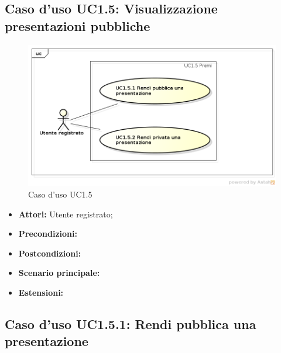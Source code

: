 \subsection{Caso d'uso UC1.5: Visualizzazione presentazioni pubbliche}

\begin{figure}[h]
	\begin{center}
	\includegraphics[scale=0.4]{diagram/UC1-5.png}
	\caption{Caso d'uso UC1.5}
	\end{center}
\end{figure}

\begin{itemize}
	\item \textbf{Attori:} Utente registrato; 
	\item \textbf{Precondizioni:}
	\item \textbf{Postcondizioni:}
	\item \textbf{Scenario principale:}
	\item \textbf{Estensioni:}
\end{itemize}

\subsection{Caso d'uso UC1.5.1: Rendi pubblica una presentazione}

